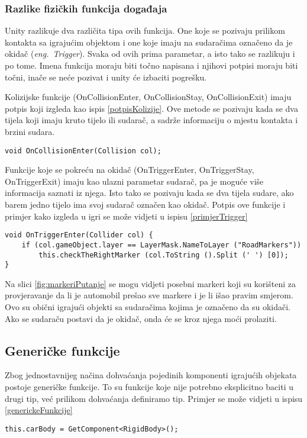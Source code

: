 \subsubsection{Razlike fizičkih funkcija događaja}
Unity razlikuje dva različita tipa ovih funkcija. One koje se pozivaju prilikom kontakta sa igrajućim objektom i one koje imaju na sudaračima označeno da je okidač (\emph{eng.~Trigger}). Svaka od ovih prima parametar, a isto tako se razlikuju i po tome. Imena funkcija moraju biti točno napisana i njihovi potpisi moraju biti točni, inače se neće pozivat i unity će izbaciti pogrešku. \par
Kolizijske funkcije (OnCollisionEnter, OnCollisionStay, OnCollisionExit) imaju potpis koji izgleda kao ispis \ref{potpisKolizije}. Ove metode se pozivaju kada se dva tijela koji imaju kruto tijelo ili sudarač, a sadrže informaciju o mjestu kontakta i brzini sudara.
\begin{lstlisting}[caption={Potpis kolizijskih funkcija}, label=potpisKolizije]
void OnCollisionEnter(Collision col);
\end{lstlisting} \par
Funkcije koje se pokreću na okidač (OnTriggerEnter, OnTriggerStay, OnTriggerExit) imaju kao ulazni parametar sudarač, pa je moguće više informacija saznati iz njega. Isto tako se pozivaju kada se dva tijela sudare, ako barem jedno tijelo ima svoj sudarač označen kao okidač. Potpis ove funkcije i primjer kako izgleda u igri se može vidjeti u ispisu \ref{primjerTrigger}
\begin{lstlisting}[caption={Potpis i primjer trigger funkcije}, label=primjerTrigger]
void OnTriggerEnter(Collider col) {
	if (col.gameObject.layer == LayerMask.NameToLayer ("RoadMarkers"))
		this.checkTheRightMarker (col.ToString ().Split (' ') [0]);
}
\end{lstlisting} \par
Na slici \ref{fig:markeriPutanje} se mogu vidjeti posebni markeri koji su korišteni za provjeravanje da li je automobil prešao sve markere i je li išao pravim smjerom. Ovo su obični igrajući objekti sa sudaračima kojima je označeno da su okidači. Ako se sudaraču postavi da je okidač, onda će se kroz njega moći prolaziti. 
\subsection{Generičke funkcije}
Zbog jednostavnijeg načina dohvaćanja pojedinih komponenti igrajućih objekata postoje generičke funkcije. To su funkcije koje nije potrebno eksplicitno baciti u drugi tip, već prilikom dohvaćanja definiramo tip. Primjer se može vidjeti u ispisu \ref{generickeFunkcije}
\begin{lstlisting}[caption={Primjer generičke funkcije}, label=generickeFunkcije]
this.carBody = GetComponent<RigidBody>();
\end{lstlisting}